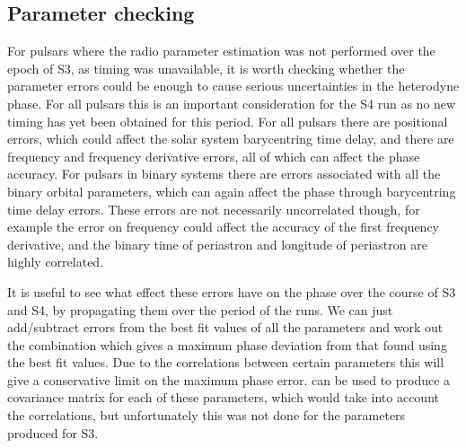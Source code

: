 \subsection{Parameter checking}
For pulsars where the radio parameter estimation was not performed over the epoch of S3, as timing
was unavailable, it is worth checking whether the parameter errors could be enough to cause serious
uncertainties in the heterodyne phase. For all pulsars this is an important consideration for the S4
run as no new timing has yet been obtained for this period. For all pulsars there are positional
errors, which could affect the solar system barycentring time delay, and there are frequency and
frequency derivative errors, all of which can affect the phase accuracy. For pulsars in binary
systems there are errors associated with all the binary orbital parameters, which can again affect
the phase through barycentring time delay errors. These errors are not necessarily uncorrelated
though, for example the error on frequency could affect the accuracy of the first frequency
derivative, and the binary time of periastron and longitude of periastron are highly correlated.

It is useful to see what effect these errors have on the phase over the course of S3 and S4, by
propagating them over the period of the runs. We can just add/subtract errors from the best fit
values of all the parameters and work out the combination which gives a maximum phase deviation from
that found using the best fit values. Due to the correlations between certain parameters this will
give a conservative limit on the maximum phase error. \tempo can be used to produce a covariance
matrix for each of these parameters, which would take into account the correlations, but
unfortunately this was not done for the parameters produced for S3.

